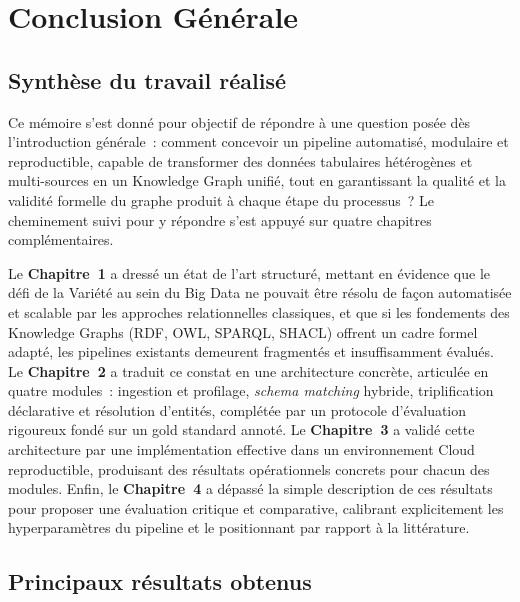 \chapter*{Conclusion Générale}
\label{chap:conclusion_generale}

\section*{Synthèse du travail réalisé}

Ce mémoire s'est donné pour objectif de répondre à une question posée
dès l'introduction générale~: comment concevoir un pipeline
automatisé, modulaire et reproductible, capable de transformer des
données tabulaires hétérogènes et multi-sources en un Knowledge Graph
unifié, tout en garantissant la qualité et la validité formelle du
graphe produit à chaque étape du processus~? Le cheminement suivi
pour y répondre s'est appuyé sur quatre chapitres complémentaires.

Le \textbf{Chapitre~1} a dressé un état de l'art structuré, mettant
en évidence que le défi de la Variété au sein du Big Data ne pouvait
être résolu de façon automatisée et scalable par les approches
relationnelles classiques, et que si les fondements des Knowledge
Graphs (RDF, OWL, SPARQL, SHACL) offrent un cadre formel adapté, les
pipelines existants demeurent fragmentés et insuffisamment évalués.
Le \textbf{Chapitre~2} a traduit ce constat en une architecture
concrète, articulée en quatre modules~: ingestion et profilage,
\textit{schema matching} hybride, triplification déclarative et
résolution d'entités, complétée par un protocole d'évaluation rigoureux
fondé sur un gold standard annoté. Le \textbf{Chapitre~3} a validé
cette architecture par une implémentation effective dans un
environnement Cloud reproductible, produisant des résultats
opérationnels concrets pour chacun des modules. Enfin, le
\textbf{Chapitre~4} a dépassé la simple description de ces résultats
pour proposer une évaluation critique et comparative, calibrant
explicitement les hyperparamètres du pipeline et le positionnant par
rapport à la littérature.

\section*{Principaux résultats obtenus}


